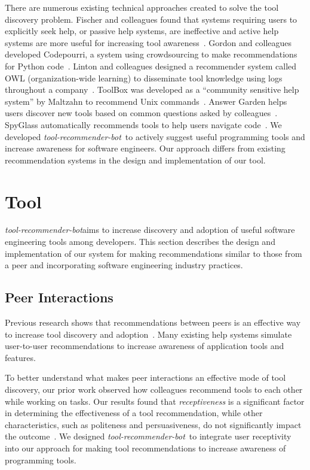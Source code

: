 \documentclass[conference]{IEEEtran}
\newcommand{\tool}{\textsl{tool-recommender-bot}}
\begin{document}
There are numerous existing technical approaches created to solve the tool discovery problem. Fischer and colleagues found that systems requiring users to explicitly seek help, or passive help systems, are ineffective and active help systems are more useful for increasing tool awareness~\cite{Fischer1984ActiveHelpSystems}. Gordon and colleagues developed Codepourri, a system using crowdsourcing to make recommendations for Python code~\cite{Gordon2015Codepourri}. Linton and colleagues designed a recommender system called OWL (organization-wide learning) to disseminate tool knowledge using logs throughout a company~\cite{Linton2000OWL}. ToolBox was developed as a ``community sensitive help system'' by Maltzahn to recommend Unix commands~\cite{Maltzahn1995Toolbox}. Answer Garden helps users discover new tools based on common questions asked by colleagues~\cite{Ackerman1990AnswerGarden}. SpyGlass automatically recommends tools to help users navigate code~\cite{Viriyakattiyaporn2010Spyglass}. We developed \tool~to actively suggest useful programming tools and increase awareness for software engineers. Our approach differs from existing recommendation systems in the design and implementation of our tool.

\section{Tool}
\tool aims to increase discovery and adoption of useful software engineering tools among developers. This section describes the design and implementation of our system for making recommendations similar to those from a peer and incorporating software engineering industry practices.

\subsection{Peer Interactions}
Previous research shows that recommendations between peers is an effective way to increase tool discovery and adoption~\cite{MurphyHill2011PeerInteraction}. Many existing help systems simulate user-to-user recommendations to increase awareness of application tools and features. 

To better understand what makes peer interactions an effective mode of tool discovery, our prior work observed how colleagues recommend tools to each other while working on tasks. Our results found that \emph{receptiveness} is a significant factor in determining the effectiveness of a tool recommendation, while other characteristics, such as politeness and persuasiveness, do not significantly impact the outcome~\cite{vlhcc17}. We designed \tool~to integrate user receptivity into our approach for making tool recommendations to increase awareness of programming tools.
\end{document}
